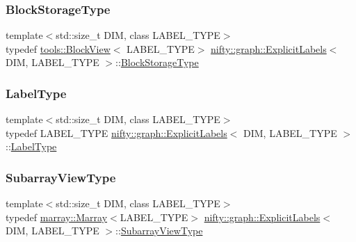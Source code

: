 \subsubsection{\texorpdfstring{Block\+Storage\+Type}{BlockStorageType}}
{\footnotesize\ttfamily template$<$std\+::size\+\_\+t D\+IM, class L\+A\+B\+E\+L\+\_\+\+T\+Y\+PE$>$ \\
typedef \hyperlink{classnifty_1_1tools_1_1BlockView}{tools\+::\+Block\+View}$<$ L\+A\+B\+E\+L\+\_\+\+T\+Y\+PE$>$ \hyperlink{classnifty_1_1graph_1_1ExplicitLabels}{nifty\+::graph\+::\+Explicit\+Labels}$<$ D\+IM, L\+A\+B\+E\+L\+\_\+\+T\+Y\+PE $>$\+::\hyperlink{classnifty_1_1graph_1_1ExplicitLabels_a896653b58048ec52d8e00800279d9b53}{Block\+Storage\+Type}}

\mbox{\label{classnifty_1_1graph_1_1ExplicitLabels_a3defd2851b5e7071f23a0fdea7aafff0}} 
\subsubsection{\texorpdfstring{Label\+Type}{LabelType}}
{\footnotesize\ttfamily template$<$std\+::size\+\_\+t D\+IM, class L\+A\+B\+E\+L\+\_\+\+T\+Y\+PE$>$ \\
typedef L\+A\+B\+E\+L\+\_\+\+T\+Y\+PE \hyperlink{classnifty_1_1graph_1_1ExplicitLabels}{nifty\+::graph\+::\+Explicit\+Labels}$<$ D\+IM, L\+A\+B\+E\+L\+\_\+\+T\+Y\+PE $>$\+::\hyperlink{classnifty_1_1graph_1_1ExplicitLabels_a3defd2851b5e7071f23a0fdea7aafff0}{Label\+Type}}

\mbox{\label{classnifty_1_1graph_1_1ExplicitLabels_ae07fe2aed8059beb43b043e8a3becdb7}} 
\subsubsection{\texorpdfstring{Subarray\+View\+Type}{SubarrayViewType}}
{\footnotesize\ttfamily template$<$std\+::size\+\_\+t D\+IM, class L\+A\+B\+E\+L\+\_\+\+T\+Y\+PE$>$ \\
typedef \hyperlink{classandres_1_1Marray}{marray\+::\+Marray}$<$L\+A\+B\+E\+L\+\_\+\+T\+Y\+PE$>$ \hyperlink{classnifty_1_1graph_1_1ExplicitLabels}{nifty\+::graph\+::\+Explicit\+Labels}$<$ D\+IM, L\+A\+B\+E\+L\+\_\+\+T\+Y\+PE $>$\+::\hyperlink{classnifty_1_1graph_1_1ExplicitLabels_ae07fe2aed8059beb43b043e8a3becdb7}{Subarray\+View\+Type}}

